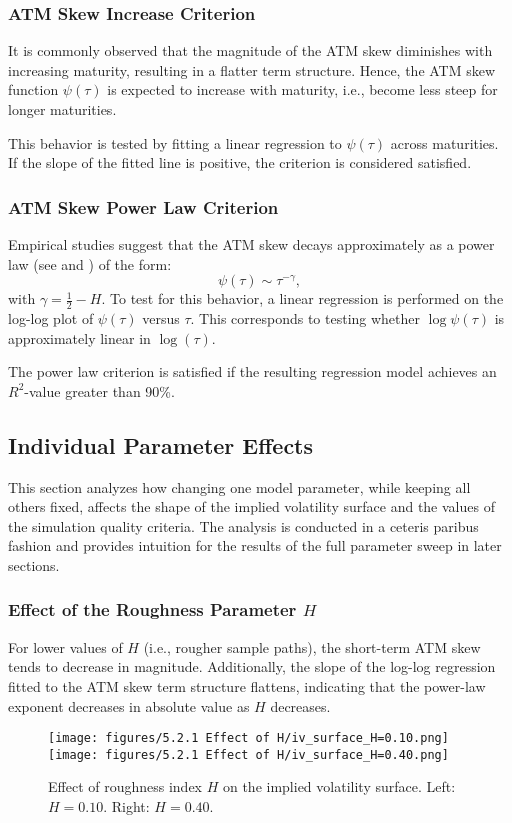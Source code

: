 \subsubsection*{ATM Skew Increase Criterion}
It is commonly observed that the magnitude of the ATM skew diminishes with increasing maturity, resulting in a flatter term structure. Hence, the ATM skew function $\psi(\tau)$ is expected to increase with maturity, i.e., become less steep for longer maturities.

This behavior is tested by fitting a linear regression to $\psi(\tau)$ across maturities. If the slope of the fitted line is positive, the criterion is considered satisfied.

\subsubsection*{ATM Skew Power Law Criterion}
Empirical studies suggest that the ATM skew decays approximately as a power law (see \citealp{Fukasawa2011} and \citealp{GatheralJaissonRosenbaum2018}) of the form:
\begin{equation} \label{eq:PowerLaw}
    \psi(\tau) \sim \tau^{-\gamma},
\end{equation}
with $\gamma = \tfrac{1}{2} - H$. To test for this behavior, a linear regression is performed on the log-log plot of $\psi(\tau)$ versus $\tau$. This corresponds to testing whether $\log \psi(\tau)$ is approximately linear in $\log(\tau)$.

The power law criterion is satisfied if the resulting regression model achieves an $R^2$-value greater than 90\%.


\subsection{Individual Parameter Effects} \label{subsec:IndividualParameterEffects}

This section analyzes how changing one model parameter, while keeping all others fixed, affects the shape of the implied volatility surface and the values of the simulation quality criteria. The analysis is conducted in a ceteris paribus fashion and provides intuition for the results of the full parameter sweep in later sections.

\subsubsection*{Effect of the Roughness Parameter $H$}
For lower values of $H$ (i.e., rougher sample paths), the short-term ATM skew tends to decrease in magnitude. Additionally, the slope of the log-log regression fitted to the ATM skew term structure flattens, indicating that the power-law exponent decreases in absolute value as $H$ decreases.
\begin{figure}[H]
    \centering
    \texttt{[image: figures/5.2.1 Effect of H/iv\_surface\_H=0.10.png]}
    \texttt{[image: figures/5.2.1 Effect of H/iv\_surface\_H=0.40.png]}
    \caption{Effect of roughness index $H$ on the implied volatility surface. Left: $H=0.10$. Right: $H=0.40$.}
    \label{fig:H_effect}
\end{figure}

